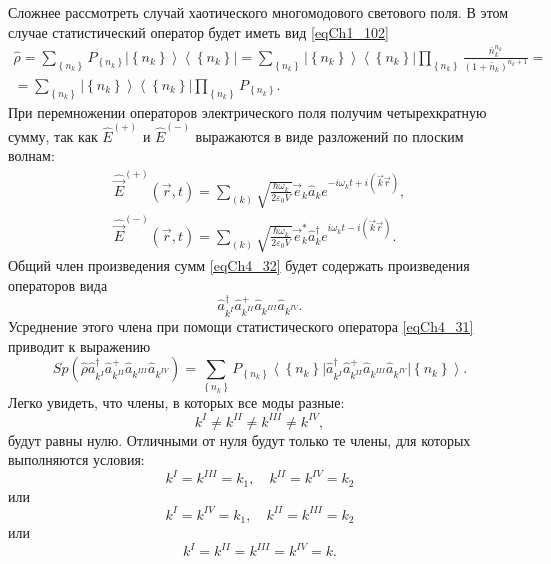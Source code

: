 Сложнее рассмотреть случай хаотического многомодового светового
поля. В этом случае статистический оператор будет иметь вид
\eqref{eqCh1_102} 
\begin{eqnarray}
\hat{\rho} = \sum_{\left\{n_k\right\}} P_{\left\{n_k\right\}} \left|\left\{n_k\right\}\right>\left<\left\{n_k\right\}\right| = 
\sum_{\left\{n_k\right\}} 
 \left|\left\{n_k\right\}\right>\left<\left\{n_k\right\}\right|
\prod_{\left\{n_k\right\}} 
\frac{\bar{n}_k^{n_k}}{\left(1 + \bar{n}_k\right)^{n_k+1}} = 
\nonumber \\
= 
\sum_{\left\{n_k\right\}} 
 \left|\left\{n_k\right\}\right>\left<\left\{n_k\right\}\right|
\prod_{\left\{n_k\right\}} P_{\left\{n_k\right\}}.
\label{eqCh4_31}
\end{eqnarray}
При перемножении операторов электрического поля получим четырехкратную
сумму, так как $\hat{E}^{(+)}$ и $\hat{E}^{(-)}$ выражаются в виде
разложений по плоским волнам: 
\begin{eqnarray}
\hat{\vec{E}}^{(+)}\left(\vec{r}, t\right) = \sum_{(k)}
\sqrt{\frac{\hbar \omega_k}{2 \varepsilon_0 V}} \vec{e}_k \hat{a}_k
e^{-i \omega_k t + i \left(\vec{k} \vec{r}\right)},
\nonumber \\
\hat{\vec{E}}^{(-)}\left(\vec{r}, t\right) = \sum_{(k)}
\sqrt{\frac{\hbar \omega_k}{2 \varepsilon_0 V}} \vec{e}_k^{*} \hat{a}_k^{\dag}
e^{i \omega_k t - i \left(\vec{k} \vec{r}\right)}.
\label{eqCh4_32}
\end{eqnarray}
Общий член произведения сумм \eqref{eqCh4_32} будет содержать
произведения операторов вида 
\begin{equation}
\hat{a}^{\dag}_{k^{I}}\hat{a}^{+}_{k^{II}}\hat{a}_{k^{III}}\hat{a}_{k^{IV}}.
\label{eqCh4_33}
\end{equation}
Усреднение этого члена при помощи статистического оператора
\eqref{eqCh4_31} приводит к выражению 
\[
Sp\left(\hat{\rho}
\hat{a}^{\dag}_{k^{I}}\hat{a}^{+}_{k^{II}}\hat{a}_{k^{III}}\hat{a}_{k^{IV}}
\right) = 
\sum_{\left\{n_k\right\}} P_{\left\{n_k\right\}}
\left<\left\{n_k\right\}\right|
\hat{a}^{\dag}_{k^{I}}\hat{a}^{+}_{k^{II}}\hat{a}_{k^{III}}\hat{a}_{k^{IV}}
\left|\left\{n_k\right\}\right>.
\]
Легко увидеть, что члены, в которых все моды разные: 
\[
k^{I} \neq k^{II} \neq k^{III} \neq k^{IV},
\]
будут равны нулю. Отличными от нуля будут только те члены, для которых
выполняются условия:
\[
k^{I} = k^{III} = k_1, \quad k^{II} = k^{IV} = k_2
\]
или
\[
k^{I} = k^{IV} = k_1, \quad k^{II} = k^{III} = k_2
\]
или
\[
k^{I} = k^{II} =  k^{III} = k^{IV} = k.
\]   

